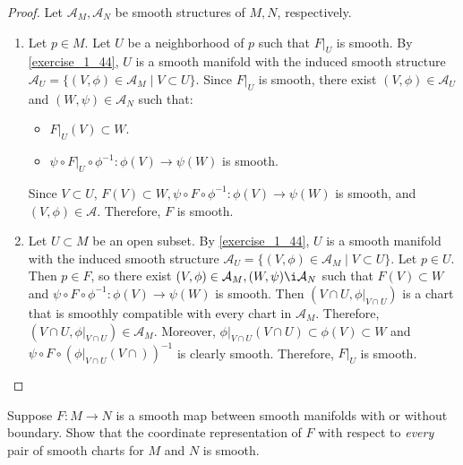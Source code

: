 \begin{proof}
  Let $\mathcal{A}_M, \mathcal{A}_N$ be smooth structures of $M, N$, respectively.
  \begin{enumerate}[label=(\alph*)]
    \item 
      Let $p \in M$.
      Let $U$ be a neighborhood of $p$ such that $F\vert_U$ is smooth.
      By \ref{exercise_1_44}, $U$ is a smooth manifold with the induced smooth structure $\mathcal{A}_U = \{ (V, \phi) \in \mathcal{A}_M \mid V \subset U \}$.
      Since $F\vert_U$ is smooth, there exist $(V, \phi) \in \mathcal{A}_U$ and $(W, \psi) \in \mathcal{A}_N$ such that:
      \begin{itemize}
        \item
          $F\vert_U(V) \subset W$.
        \item
          $\psi \circ F\vert_U \circ \phi^{-1}:\phi(V) \rightarrow \psi(W)$ is smooth.
      \end{itemize}
      Since $V \subset U$, $F(V) \subset W, \psi \circ F \circ \phi^{-1}:\phi(V) \rightarrow \psi(W)$ is smooth, and $(V, \phi) \in \mathcal{A}$.
      Therefore, $F$ is smooth.
    \item
      Let $U \subset M$ be an open subset.
      By \ref{exercise_1_44}, $U$ is a smooth manifold with the induced smooth structure $\mathcal{A}_U = \{ (V, \phi) \in \mathcal{A}_M \mid V \subset U \}$.
      Let $p \in U$.
      Then $p \in F$, so there exist $(V, \phi) \in \mathcal{A}_M, (W, \psi) \i \mathcal{A}_N$ such that $F(V) \subset W$ and $\psi \circ F \circ \phi^{-1}: \phi(V) \rightarrow \psi(W)$ is smooth.
      Then $(V \cap U, \phi\vert_{V \cap U})$ is a chart that is smoothly compatible with every chart in $\mathcal{A}_M$.
      Therefore, $(V \cap U, \phi\vert_{V \cap U}) \in \mathcal{A}_M$.
      Moreover, $\phi\vert_{V \cap U}(V \cap U) \subset \phi(V) \subset W$ and $\psi \circ F \circ (\phi\vert_{V \cap U}(V \cap ))^{-1}$ is clearly smooth.
      Therefore, $F \vert_U$ is smooth.
  \end{enumerate}
\end{proof}

\begin{customexer}{2.9}
  Suppose $F: M \rightarrow N$ is a smooth map between smooth manifolds with or without boundary.
  Show that the coordinate representation of $F$ with respect to \textit{every} pair of smooth charts for $M$ and $N$ is smooth.
\end{customexer}

